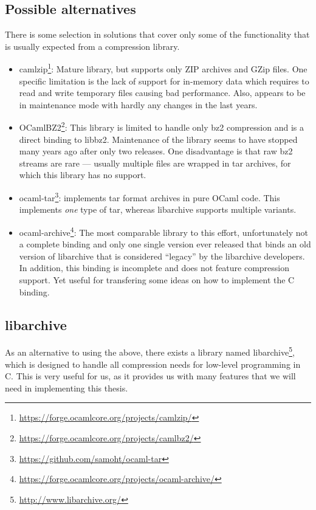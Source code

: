 \documentclass[parskip=half]{scrreprt}
\begin{document}
\subsection{Possible alternatives}
\label{sec:alternatives}

There is some selection in solutions that cover only some of the functionality
that is usually expected from a compression library.

\begin{itemize}
  \item camlzip\footnote{\url{https://forge.ocamlcore.org/projects/camlzip/}}:
    Mature library, but supports only ZIP archives and GZip files. One specific
    limitation is
    the lack of support for in-memory data which requires to read and write
    temporary files causing bad performance. Also, appears to be in maintenance
    mode with hardly any changes in the last years.
  \item OCamlBZ2\footnote{\url{https://forge.ocamlcore.org/projects/camlbz2/}}:
    This library is limited to handle only bz2 compression and is a direct
    binding to libbz2. Maintenance of the library seems to have stopped many
    years ago after only two releases. One disadvantage is that raw bz2
    streams are rare — usually multiple files are wrapped in tar archives,
    for which this library has no support.
  \item ocaml-tar\footnote{\url{https://github.com/samoht/ocaml-tar}}:
    implements tar format archives in pure OCaml code. This implements
    \emph{one} type of tar, whereas libarchive supports multiple variants.
  \item ocaml-archive\footnote{\url{https://forge.ocamlcore.org/projects/ocaml-archive/}}:
    The most comparable library to this effort, unfortunately not a complete
    binding and only one single version ever released that binds an old version
    of libarchive that is considered \enquote{legacy} by the libarchive
    developers. In addition, this binding is incomplete and does not feature
    compression support. Yet useful for transfering some ideas on how to
    implement the C binding.
\end{itemize}

\subsection{libarchive}
\label{sec:libarchive}

As an alternative to using the above, there exists a library named
libarchive\footnote{\url{http://www.libarchive.org/}}, which is designed to
handle all compression needs for low-level programming in C. This is very
useful for us, as it provides us with many features that we will need in
implementing this thesis.
\end{document}
